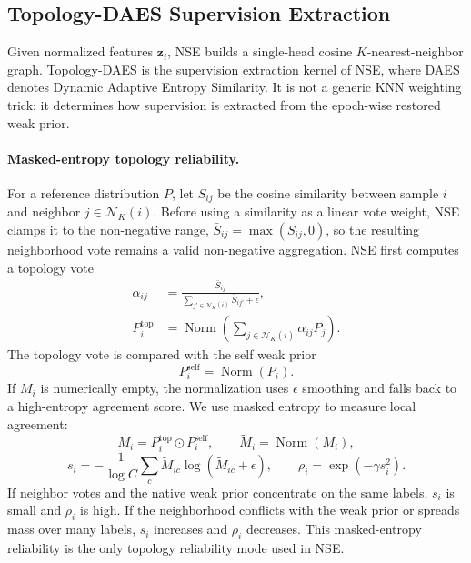 \subsection{Topology-DAES Supervision Extraction}
\label{sec:daes}
Given normalized features $\mathbf{z}_i$, NSE builds a single-head cosine
$K$-nearest-neighbor graph. Topology-DAES is the supervision extraction kernel
of NSE, where DAES denotes Dynamic Adaptive Entropy Similarity. It is not a
generic KNN weighting trick: it determines how supervision is extracted from the
epoch-wise restored weak prior.

\paragraph{Masked-entropy topology reliability.}
For a reference distribution $P$, let $S_{ij}$ be the cosine similarity between
sample $i$ and neighbor $j\in\mathcal{N}_K(i)$. Before using a similarity as a
linear vote weight, NSE clamps it to the non-negative range,
$\bar{S}_{ij}=\max(S_{ij},0)$, so the resulting neighborhood vote remains a
valid non-negative aggregation. NSE first computes a topology vote
\begin{equation}
\begin{aligned}
    \alpha_{ij}
    &=
    \frac{\bar{S}_{ij}}{\sum_{j'\in\mathcal{N}_K(i)}\bar{S}_{ij'}+\epsilon},
    \\
    P^{\mathrm{top}}_i
    &=
    \operatorname{Norm}
    \left(
    \sum_{j\in\mathcal{N}_K(i)}\alpha_{ij}P_j
    \right).
\end{aligned}
\end{equation}
The topology vote is compared with the self weak prior
\begin{equation}
    P^{\mathrm{self}}_i=\operatorname{Norm}(P_i).
\end{equation}
If $M_i$ is numerically empty, the normalization uses $\epsilon$ smoothing and
falls back to a high-entropy agreement score. We use masked entropy to measure
local agreement:
\begin{equation}
    M_i=P^{\mathrm{top}}_i\odot P^{\mathrm{self}}_i,
    \qquad
    \tilde{M}_i=\operatorname{Norm}(M_i),
\end{equation}
\begin{equation}
    s_i
    =
    -\frac{1}{\log C}
    \sum_c
    \tilde{M}_{ic}\log(\tilde{M}_{ic}+\epsilon),
    \qquad
    \rho_i=\exp(-\gamma s_i^2).
    \label{eq:topology_reliability}
\end{equation}
If neighbor votes and the native weak prior concentrate on the same labels,
$s_i$ is small and $\rho_i$ is high. If the neighborhood conflicts with the
weak prior or spreads mass over many labels, $s_i$ increases and $\rho_i$
decreases. This masked-entropy reliability is the only topology reliability
mode used in NSE.

